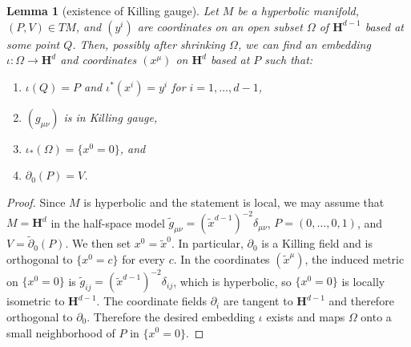 \documentclass[reqno,12pt,letterpaper]{amsart}
\newcommand{\Hyp}{\mathbf H}
\newtheorem{lemma}[theorem]{Lemma}
\theoremstyle{definition}
\numberwithin{equation}{section}
\begin{document}
\begin{lemma}[existence of Killing gauge]\label{existence of Killing gauge}
Let $M$ be a hyperbolic manifold, $(P, V) \in TM$, and $(y^i)$ are coordinates on an open subset $\Omega$ of $\Hyp^{d - 1}$ based at some point $Q$.
Then, possibly after shrinking $\Omega$, we can find an embedding $\iota: \Omega \to \Hyp^d$ and coordinates $(x^\mu)$ on $\Hyp^d$ based at $P$ such that:
\begin{enumerate}
\item $\iota(Q) = P$ and $\iota^* (x^i) = y^i$ for $i = 1, \dots, d - 1$,
\item $(g_{\mu\nu})$ is in Killing gauge,
\item $\iota_* (\Omega) = \{x^0 = 0\}$, and
\item $\partial_0(P) = V$.
\end{enumerate}
\end{lemma}
\begin{proof}
Since $M$ is hyperbolic and the statement is local, we may assume that $M = \Hyp^d$ in the half-space model $\tilde g_{\mu\nu} = (\tilde x^{d - 1})^{-2} \delta_{\mu\nu}$, $P = (0, \dots, 0, 1)$, and $V = \tilde \partial_0(P)$.
We then set $x^0 = \tilde x^0$.
In particular, $\partial_0$ is a Killing field and is orthogonal to $\{x^0 = c\}$ for every $c$.
In the coordinates $(\tilde x^\mu)$, the induced metric on $\{x^0 = 0\}$ is $\tilde g_{ij} = (\tilde x^{d - 1})^{-2} \delta_{ij}$, which is hyperbolic, so $\{x^0 = 0\}$ is locally isometric to $\Hyp^{d - 1}$.
The coordinate fields $\partial_i$ are tangent to $\Hyp^{d - 1}$ and therefore orthogonal to $\partial_0$.
Therefore the desired embedding $\iota$ exists and maps $\Omega$ onto a small neighborhood of $P$ in $\{x^0 = 0\}$.
\end{proof}
\end{document}
